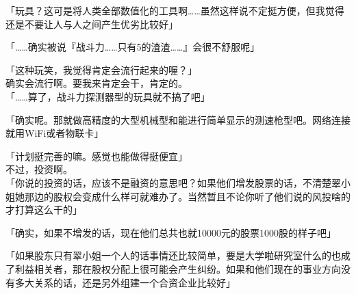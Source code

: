 「玩具？这可是将人类全部数值化的工具啊……虽然这样说不定挺方便，但我觉得还是不要让人与人之间产生优劣比较好」

「……确实被说『战斗力……只有5的渣渣……』会很不舒服呢」

「这种玩笑，我觉得肯定会流行起来的喔？」\\

确实会流行啊。要我来肯定会干，肯定的。\\

「……算了，战斗力探测器型的玩具就不搞了吧」

「确实呢。那就做高精度的大型机械型和能进行简单显示的测速枪型吧。网络连接就用WiFi或者物联卡」

「计划挺完善的嘛。感觉也能做得挺便宜」\\

不过，投资啊。\\

「你说的投资的话，应该不是融资的意思吧？如果他们增发股票的话，不清楚翠小姐她那边的股权会变成什么样可就难办了。当然暂且不论你听了他们说的风投啥的才打算这么干的」

「确实，如果不增发的话，现在他们总共也就10000元的股票1000股的样子吧」

「如果股东只有翠小姐一个人的话事情还比较简单，要是大学啦研究室什么的也成了利益相关者，那在股权分配上很可能会产生纠纷。如果和他们现在的事业方向没有多大关系的话，还是另外组建一个合资企业比较好」\\

